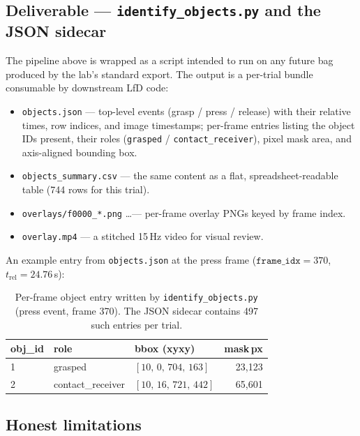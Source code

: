 \documentclass[11pt]{article}
\begin{document}
\subsection{Deliverable --- \texttt{identify\_objects.py} and the JSON sidecar}

The pipeline above is wrapped as a script intended to run on any future bag
produced by the lab's standard export. The output is a per-trial bundle
consumable by downstream LfD code:

\begin{itemize}[noitemsep]
  \item \texttt{objects.json} --- top-level events (grasp / press / release)
        with their relative times, row indices, and image timestamps; per-frame
        entries listing the object IDs present, their roles
        (\texttt{grasped} / \texttt{contact\_receiver}), pixel mask area, and
        axis-aligned bounding box.
  \item \texttt{objects\_summary.csv} --- the same content as a flat,
        spreadsheet-readable table (744 rows for this trial).
  \item \texttt{overlays/f0000\_*.png} \ldots --- per-frame overlay PNGs
        keyed by frame index.
  \item \texttt{overlay.mp4} --- a stitched 15\,Hz video for visual review.
\end{itemize}

An example entry from \texttt{objects.json} at the press frame
($\texttt{frame\_idx}=370$, $t_{\text{rel}}=24.76$\,s):

\begin{table}[H]
\centering
\begin{tabular}{lllr}
\toprule
\textbf{obj\_id} & \textbf{role} & \textbf{bbox (xyxy)} & \textbf{mask\,px} \\
\midrule
1 & grasped          & $[10,\,0,\,704,\,163]$  & 23{,}123 \\
2 & contact\_receiver & $[10,\,16,\,721,\,442]$ & 65{,}601 \\
\bottomrule
\end{tabular}
\caption{Per-frame object entry written by \texttt{identify\_objects.py} (press
event, frame 370). The JSON sidecar contains 497 such entries per trial.}
\end{table}

\subsection{Honest limitations}
\end{document}
